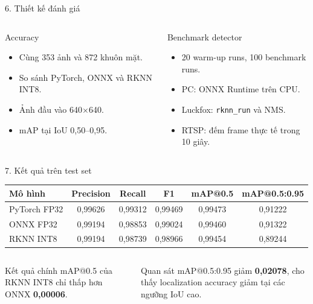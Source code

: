 \documentclass[aspectratio=169,11pt]{beamer}
\begin{document}
\begin{frame}{6. Thiết kế đánh giá}
\begin{columns}[T,onlytextwidth]
  \begin{block}{Accuracy}
  \begin{itemize}
    \item Cùng 353 ảnh và 872 khuôn mặt.
    \item So sánh PyTorch, ONNX và RKNN INT8.
    \item Ảnh đầu vào 640$\times$640.
    \item mAP tại IoU 0,50--0,95.
  \end{itemize}
  \end{block}
  \begin{block}{Benchmark detector}
  \begin{itemize}
    \item 20 warm-up runs, 100 benchmark runs.
    \item PC: ONNX Runtime trên CPU.
    \item Luckfox: \texttt{rknn\_run} và NMS.
    \item RTSP: đếm frame thực tế trong 10 giây.
  \end{itemize}
  \end{block}
\end{columns}
\vspace{0.6em}
\centering\small
\end{frame}

\begin{frame}{7. Kết quả trên test set}
\centering
\begin{tabular}{lccccc}
\toprule
\textbf{Mô hình} & \textbf{Precision} & \textbf{Recall} & \textbf{F1} & \textbf{mAP@0.5} & \textbf{mAP@0.5:0.95} \\
\midrule
PyTorch FP32 & 0,99626 & 0,99312 & 0,99469 & 0,99473 & 0,91222 \\
ONNX FP32 & 0,99194 & 0,98853 & 0,99024 & 0,99460 & 0,91322 \\
RKNN INT8 & 0,99194 & 0,98739 & 0,98966 & 0,99454 & 0,89244 \\
\bottomrule
\end{tabular}

\vspace{1em}
\begin{columns}[T,onlytextwidth]
  \begin{block}{Kết quả chính}
  mAP@0.5 của RKNN INT8 chỉ thấp hơn ONNX \textbf{0,00006}.
  \end{block}
  \begin{block}{Quan sát}
  mAP@0.5:0.95 giảm \textbf{0,02078}, cho thấy localization accuracy giảm tại các ngưỡng IoU cao.
  \end{block}
\end{columns}
\end{frame}
\end{document}
